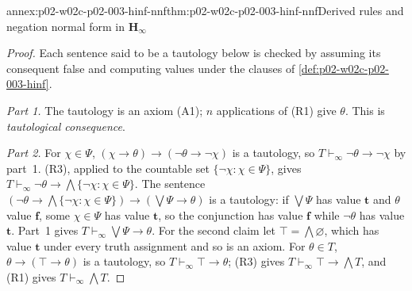 \begin{annexitem}{annex:p02-w02c-p02-003-hinf-nnf}{thm:p02-w02c-p02-003-hinf-nnf}{Derived rules and negation normal form in \(\mathbf H_{\infty}\)}
\begin{proof}
Each sentence said to be a tautology below is checked by assuming its
consequent false and computing values under the clauses of
\cref{def:p02-w02c-p02-003-hinf}.

\emph{Part 1.}  The tautology is an axiom (A1); \(n\) applications of
(R1) give \(\theta\).  This is \emph{tautological consequence}.

\emph{Part 2.}  For \(\chi\in\Psi\),
\((\chi\to\theta)\to(\neg\theta\to\neg\chi)\) is a tautology, so
\(T\vdash_{\infty}\neg\theta\to\neg\chi\) by part~1.  (R3), applied to the
countable set \(\{\neg\chi:\chi\in\Psi\}\), gives
\(T\vdash_{\infty}\neg\theta\to\bigwedge\{\neg\chi:\chi\in\Psi\}\).  The
sentence \((\neg\theta\to\bigwedge\{\neg\chi:\chi\in\Psi\})\to
(\bigvee\Psi\to\theta)\) is a tautology: if \(\bigvee\Psi\) has value
\(\mathbf t\) and \(\theta\) value \(\mathbf f\), some \(\chi\in\Psi\) has
value \(\mathbf t\), so the conjunction has value \(\mathbf f\) while
\(\neg\theta\) has value \(\mathbf t\).  Part~1 gives
\(T\vdash_{\infty}\bigvee\Psi\to\theta\).  For the second claim let
\(\top=\bigwedge\varnothing\), which has value \(\mathbf t\) under every
truth assignment and so is an axiom.  For \(\theta\in T\),
\(\theta\to(\top\to\theta)\) is a tautology, so
\(T\vdash_{\infty}\top\to\theta\); (R3) gives
\(T\vdash_{\infty}\top\to\bigwedge T\), and (R1) gives
\(T\vdash_{\infty}\bigwedge T\).


\end{proof}
\end{annexitem}
